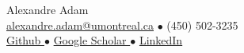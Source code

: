\begin{center}
  {\LARGE Alexandre Adam} \\[4pt]
  {\small \href{mailto:alexandre.adam@mila.quebec}{alexandre.adam@umontreal.ca} $\bullet$ (450) 502-3235} \\
  {\small
    \href{https://github.com/AlexandreAdam}{Github \faGithub} $\bullet$
    \href{https://scholar.google.com/citations?user=Mmlh_CEAAAAJ&hl=en}{Google Scholar \faGraduationCap} $\bullet$
    \href{}{LinkedIn }
}
\end{center}
\vspace{1em}
